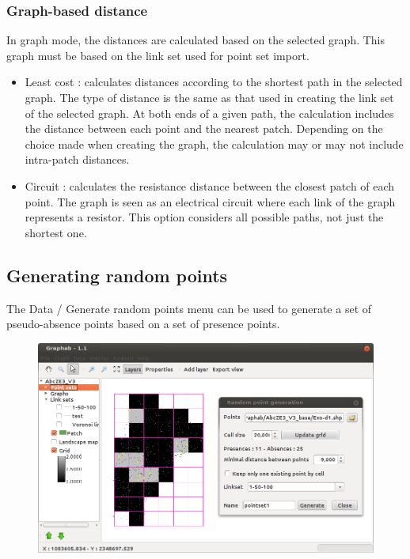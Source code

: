 \documentclass{article}
\begin{document}
\subsubsection{Graph-based distance}
In graph mode, the distances are calculated based on the selected graph. This graph must be based on the link set used for point set import.
\begin{itemize}
	\item Least cost : calculates distances according to the shortest path in the selected graph. The type of distance is the same as that used in creating the link set of the selected graph. At both ends of a given path, the calculation includes the distance between each point and the nearest patch. Depending on the choice made when creating the graph, the calculation may or may not include intra-patch distances.
	\item Circuit : calculates the resistance distance between the closest patch of each point. The graph is seen as an electrical circuit where each link of the graph represents a resistor. This option considers all possible paths, not just the shortest one.
\end{itemize}

\subsection{Generating random points}

The Data / Generate random points menu can be used to generate a set of pseudo-absence points based on a set of presence points.

\begin{figure}[H]
	\includegraphics[scale=0.5]{img/manual-en_img13.png}
\end{figure}
 
\end{document}
